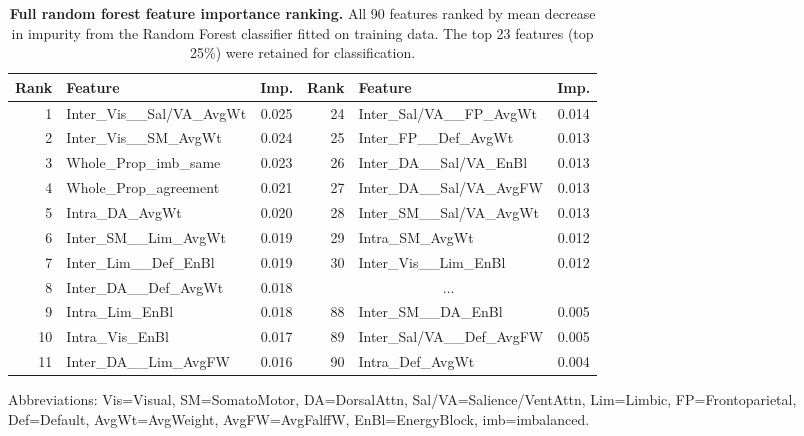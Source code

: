 \documentclass[10pt,letterpaper]{article}
\begin{document}
\begin{table}[htbp]
\centering
\caption{\textbf{Full random forest feature importance ranking.} All 90 features ranked by mean
decrease in impurity from the Random Forest classifier fitted on training data. The top 23 features
(top 25\%) were retained for classification.}
\label{tab:selected_features}
\scriptsize
\begin{tabular}{rlc|rlc}
\toprule
\textbf{Rank} & \textbf{Feature} & \textbf{Imp.} & \textbf{Rank} & \textbf{Feature} & \textbf{Imp.} \\
\midrule
1 & Inter\_Vis\_\_Sal/VA\_AvgWt & 0.025 & 24 & Inter\_Sal/VA\_\_FP\_AvgWt & 0.014 \\
2 & Inter\_Vis\_\_SM\_AvgWt & 0.024 & 25 & Inter\_FP\_\_Def\_AvgWt & 0.013 \\
3 & Whole\_Prop\_imb\_same & 0.023 & 26 & Inter\_DA\_\_Sal/VA\_EnBl & 0.013 \\
4 & Whole\_Prop\_agreement & 0.021 & 27 & Inter\_DA\_\_Sal/VA\_AvgFW & 0.013 \\
5 & Intra\_DA\_AvgWt & 0.020 & 28 & Inter\_SM\_\_Sal/VA\_AvgWt & 0.013 \\
6 & Inter\_SM\_\_Lim\_AvgWt & 0.019 & 29 & Intra\_SM\_AvgWt & 0.012 \\
7 & Inter\_Lim\_\_Def\_EnBl & 0.019 & 30 & Inter\_Vis\_\_Lim\_EnBl & 0.012 \\
8 & Inter\_DA\_\_Def\_AvgWt & 0.018 & \multicolumn{3}{c}{...} \\
9 & Intra\_Lim\_EnBl & 0.018 & 88 & Inter\_SM\_\_DA\_EnBl & 0.005 \\
10 & Intra\_Vis\_EnBl & 0.017 & 89 & Inter\_Sal/VA\_\_Def\_AvgFW & 0.005 \\
11 & Inter\_DA\_\_Lim\_AvgFW & 0.016 & 90 & Intra\_Def\_AvgWt & 0.004 \\
\bottomrule
\end{tabular}
\begin{flushleft}
\footnotesize
Abbreviations: Vis=Visual, SM=SomatoMotor, DA=DorsalAttn, Sal/VA=Salience/VentAttn,
Lim=Limbic, FP=Frontoparietal, Def=Default, AvgWt=AvgWeight, AvgFW=AvgFalffW, EnBl=EnergyBlock,
imb=imbalanced.
\end{flushleft}
\end{table}
\end{document}
